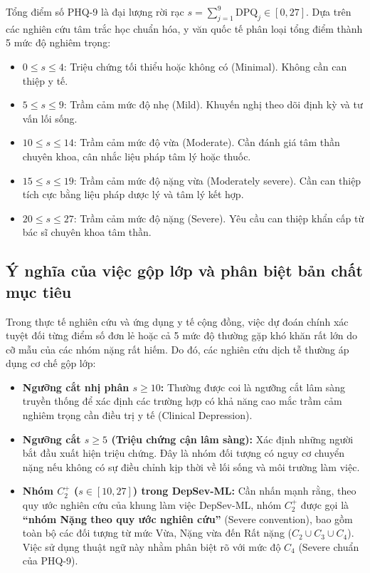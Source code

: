 Tổng điểm số PHQ-9 là đại lượng rời rạc $s = \sum_{j=1}^9 \text{DPQ}_j \in [0, 27]$. Dựa trên các nghiên cứu tâm trắc học chuẩn hóa, y văn quốc tế phân loại tổng điểm thành 5 mức độ nghiêm trọng:
\begin{itemize}
    \item $0 \le s \le 4$: Triệu chứng tối thiểu hoặc không có (Minimal). Không cần can thiệp y tế.
    \item $5 \le s \le 9$: Trầm cảm mức độ nhẹ (Mild). Khuyến nghị theo dõi định kỳ và tư vấn lối sống.
    \item $10 \le s \le 14$: Trầm cảm mức độ vừa (Moderate). Cần đánh giá tâm thần chuyên khoa, cân nhắc liệu pháp tâm lý hoặc thuốc.
    \item $15 \le s \le 19$: Trầm cảm mức độ nặng vừa (Moderately severe). Cần can thiệp tích cực bằng liệu pháp dược lý và tâm lý kết hợp.
    \item $20 \le s \le 27$: Trầm cảm mức độ nặng (Severe). Yêu cầu can thiệp khẩn cấp từ bác sĩ chuyên khoa tâm thần.
\end{itemize}

\subsection{Ý nghĩa của việc gộp lớp và phân biệt bản chất mục tiêu}
Trong thực tế nghiên cứu và ứng dụng y tế cộng đồng, việc dự đoán chính xác tuyệt đối từng điểm số đơn lẻ hoặc cả 5 mức độ thường gặp khó khăn rất lớn do cỡ mẫu của các nhóm nặng rất hiếm. Do đó, các nghiên cứu dịch tễ thường áp dụng cơ chế gộp lớp:
\begin{itemize}
    \item \textbf{Ngưỡng cắt nhị phân $s \ge 10$:} Thường được coi là ngưỡng cắt lâm sàng truyền thống để xác định các trường hợp có khả năng cao mắc trầm cảm nghiêm trọng cần điều trị y tế (Clinical Depression).
    \item \textbf{Ngưỡng cắt $s \ge 5$ (Triệu chứng cận lâm sàng):} Xác định những người bắt đầu xuất hiện triệu chứng. Đây là nhóm đối tượng có nguy cơ chuyển nặng nếu không có sự điều chỉnh kịp thời về lối sống và môi trường làm việc.
    \item \textbf{Nhóm $C_2^+$ ($s \in [10, 27]$) trong DepSev-ML:} Cần nhấn mạnh rằng, theo quy ước nghiên cứu của khung làm việc DepSev-ML, nhóm $C_2^+$ được gọi là \textbf{“nhóm Nặng theo quy ước nghiên cứu”} (Severe convention), bao gồm toàn bộ các đối tượng từ mức Vừa, Nặng vừa đến Rất nặng ($C_2 \cup C_3 \cup C_4$). Việc sử dụng thuật ngữ này nhằm phân biệt rõ với mức độ $C_4$ (Severe chuẩn của PHQ-9).
\end{itemize}

